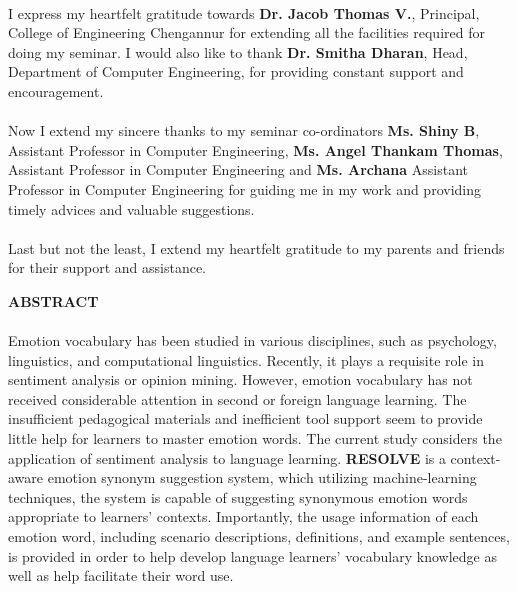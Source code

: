\documentclass[a4paper,12pt,oneside]{article}
\begin{document}
\paragraph{}
I express my heartfelt gratitude towards \textbf{Dr. Jacob Thomas V.}, Principal, College
of Engineering Chengannur for extending all the facilities required for doing my seminar.
I would also like to thank \textbf{Dr. Smitha Dharan}, Head, Department of Computer
Engineering, for providing constant support and encouragement.
\paragraph{}
Now I extend my sincere thanks to my seminar co-ordinators \textbf{Ms. Shiny B}, Assistant
Professor in Computer Engineering, \textbf{Ms. Angel Thankam Thomas}, Assistant
Professor in Computer Engineering and \textbf{Ms. Archana} Assistant Professor in Computer Engineering for guiding me in my work and providing timely
advices and valuable suggestions.
\paragraph{}
Last but not the least, I extend my heartfelt gratitude to my parents and friends for
their support and assistance.	

\newpage
\begin{center}
\large{\textbf{ABSTRACT}}
\end{center}
\vspace{4ex}
\paragraph{}
Emotion vocabulary has been studied in various disciplines, such as psychology, linguistics, and computational linguistics. Recently, it plays a requisite role in sentiment analysis or opinion mining. However, emotion vocabulary has not received considerable attention in second or foreign language learning. The insufficient pedagogical materials and inefficient tool support seem to provide little help for learners to master emotion words. The current study considers the application of sentiment analysis to language learning. \textbf{RESOLVE} is a context-aware emotion synonym suggestion system, which utilizing machine-learning techniques, the system is capable of suggesting synonymous emotion words appropriate to learners’ contexts. Importantly, the usage information of each emotion word, including scenario descriptions, definitions, and example sentences, is provided in order to help develop language learners’ vocabulary knowledge as well as help facilitate their word use. 
\end{document}
